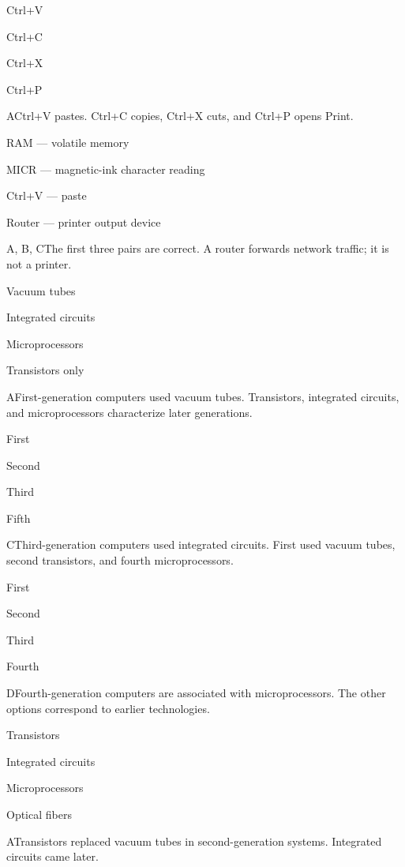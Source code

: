 \begin{enumerate}[label=\textbf{Q\arabic*.}, leftmargin=*]
  {\item Ctrl+V
   \item Ctrl+C
   \item Ctrl+X
   \item Ctrl+P}
  {A}{Ctrl+V pastes. Ctrl+C copies, Ctrl+X cuts, and Ctrl+P opens Print.}
  {\item RAM --- volatile memory
   \item MICR --- magnetic-ink character reading
   \item Ctrl+V --- paste
   \item Router --- printer output device}
  {A, B, C}{The first three pairs are correct. A router forwards network traffic; it is not a printer.}
\fi
\ifnum{}
  {\item Vacuum tubes
   \item Integrated circuits
   \item Microprocessors
   \item Transistors only}
  {A}{First-generation computers used vacuum tubes. Transistors, integrated circuits, and microprocessors characterize later generations.}
  {\item First
   \item Second
   \item Third
   \item Fifth}
  {C}{Third-generation computers used integrated circuits. First used vacuum tubes, second transistors, and fourth microprocessors.}
  {\item First
   \item Second
   \item Third
   \item Fourth}
  {D}{Fourth-generation computers are associated with microprocessors. The other options correspond to earlier technologies.}
  {\item Transistors
   \item Integrated circuits
   \item Microprocessors
   \item Optical fibers}
  {A}{Transistors replaced vacuum tubes in second-generation systems. Integrated circuits came later.}

\end{enumerate}
